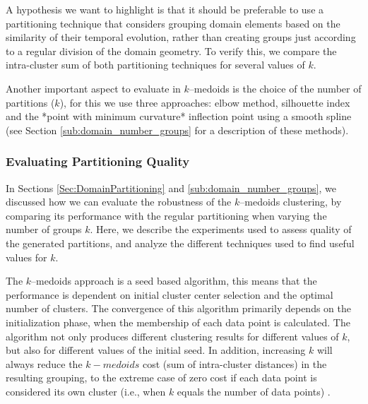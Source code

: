A hypothesis we want to highlight is that it should be preferable to use a partitioning technique that considers grouping domain elements based on the similarity of their temporal evolution, rather than creating groups just according to a regular division of the domain geometry. To verify this, we compare the intra-cluster sum of both partitioning techniques for several values of $k$.

Another important aspect to evaluate in $k$--medoids is the choice of the number of partitions ($k$), for this we use three approaches: elbow method, silhouette index and the *point with minimum curvature* inflection point using a smooth spline (see Section \ref{sub:domain_number_groups} for a description of these methods).

\subsubsection{Evaluating Partitioning Quality}
\label{Sec:EvaluatingPP}

In Sections \ref{Sec:DomainPartitioning} and \ref{sub:domain_number_groups}, we discussed how we can evaluate the robustness of the $k$--medoids clustering, by comparing its performance with the regular partitioning when varying the number of groups $k$. Here, we describe the experiments used to assess quality of the generated partitions, and analyze the different techniques used to find useful values for $k$.  %

The $k$--medoids approach is a seed based algorithm, this means that the performance is dependent on initial cluster center selection and the optimal number of clusters. The convergence of this algorithm primarily depends on the initialization phase, when the membership of each data point is calculated. The algorithm not only produces different clustering results for different values of $k$, but also for different values of the initial seed. In addition, increasing $k$ will always reduce the $k-medoids$ cost (sum of intra-cluster distances) in the resulting grouping, to the extreme case of zero cost if each data point is considered its own cluster (i.e., when $k$ equals the number of data points) \cite{HastieTF2009}. 

